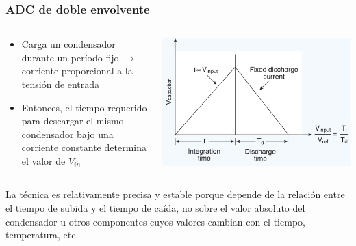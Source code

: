 \documentclass{beamer}
\begin{document}
\begin{frame}
\frametitle{ADC de doble envolvente}
  \begin{columns}
    \begin{column}{0.6\textwidth}
        \begin{itemize}
          \item Carga un condensador durante un período fijo $\rightarrow$
\alert{corriente proporcional a la tensión de entrada}
\item Entonces, el tiempo requerido para descargar el mismo condensador bajo una
\alert{corriente constante} determina el valor de $V_{in}$
        \end{itemize}
    \end{column} 
    \begin{column}{0.4\textwidth}
      \includegraphics[width=\textwidth]{d3/adc_dual_slope_curve}
    \end{column}
  \end{columns}
      \begin{block}{}
{\color{blue} La técnica es relativamente precisa y estable porque
depende de la relación entre el tiempo de subida y el tiempo de caída, no sobre
el valor absoluto del condensador u otros componentes cuyos valores cambian con
el tiempo, temperatura, etc.}  
      \end{block}
\end{frame}
\end{document}
